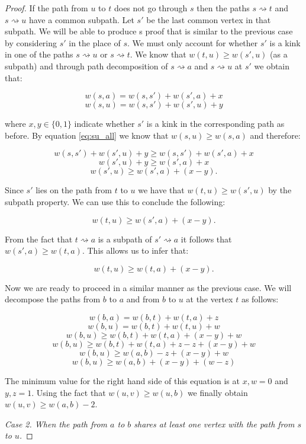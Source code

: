 \begin{proof}
If the path from $u$ to $t$ does not go through $s$ then the paths $s \rightsquigarrow t$ and $s \rightsquigarrow u$ have a common subpath. Let $s'$ be the last common vertex in that subpath. We will be able to produce s proof that is similar to the previous case by considering $s'$ in the place of $s$. We must only account for whether $s'$ is a kink in one of the paths $s \rightsquigarrow u$ or $s \rightsquigarrow t$. We know that $w(t, u) \ge w(s', u)$ (as a subpath) and through path decomposition of  $s \rightsquigarrow a$ and $s \rightsquigarrow u$ at $s'$ we obtain that:

$$ w(s, a) = w(s, s') + w(s', a) + x $$
$$ w(s, u) = w(s, s') + w(s', u) + y $$

where $x,y \in \{0, 1\}$ indicate whether $s'$ is a kink in the corresponding path as before. By equation \ref{eq:su_all} we know that $w(s, u) \ge w(s, a)$ and therefore:

$$ w(s, s') + w(s', u) + y \ge w(s, s') + w(s', a) + x  $$ 
$$ w(s', u) + y \ge w(s', a) + x $$ 
$$ w(s', u) \ge w(s', a) + (x - y).$$ 

Since $s'$ lies on the path from $t$ to $u$ we have that $w(t, u) \ge w(s', u)$ by the subpath property. We can use this to conclude the following:

$$ w(t, u) \ge w(s', a) + (x - y).$$ 

From the fact that $t \rightsquigarrow a$ is a subpath of $s' \rightsquigarrow a$ it follows that $w(s', a) \ge w(t, a)$. This allows us to infer that:

$$ w(t, u) \ge w(t, a) + (x - y). $$ 

Now we are ready to proceed in a similar manner as the previous case. We will decompose the paths from $b$ to $a$ and from $b$ to $u$ at the vertex $t$ as follows:

$$ w(b, a) = w(b, t) + w(t, a) + z  $$
$$ w(b, u) = w(b, t) + w(t, u) + w  $$
$$ w(b, u) \ge w(b, t) + w(t, a) + (x - y) + w $$
$$ w(b, u) \ge w(b, t) + w(t, a) + z - z + (x - y) + w $$
$$ w(b, u) \ge w(a, b) - z + (x - y) + w $$
$$ w(b, u) \ge w(a, b) + (x - y) + (w - z) $$

The minimum value for the right hand side of this equation is at $x, w = 0$ and $y, z = 1$. Using the fact that $w(u, v) \ge w(u, b)$ we finally obtain $ w(u, v) \ge w(a, b) - 2 $.


{\em Case 2. When the path from $a$ to $b$ shares at least one vertex with the path from $s$ to $u$.}


\end{proof}
